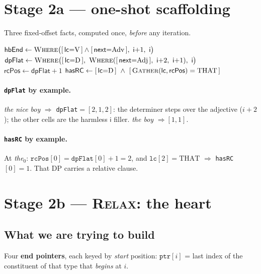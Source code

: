\documentclass[11pt]{article}
\newcommand{\code}[1]{\texttt{#1}}
\newcommand{\sop}[1]{\ensuremath{\mathsf{#1}}}
\begin{document}
\section{Stage 2a --- one-shot scaffolding}

Three fixed-offset facts, computed once, \emph{before} any iteration.

\begin{algorithm}[H]
\caption{\textsc{Scaffold} --- local span pieces}
\begin{algorithmic}[1]
\State $\sop{hbEnd} \gets \textsc{Where}\big([\,\sop{lc}{=}\text{V}\,]\wedge[\,\sop{next}{=}\text{Adv}\,],\ \sop{i}{+}1,\ \sop{i}\big)$ 
\State $\sop{dpFlat} \gets \textsc{Where}\big([\,\sop{lc}{=}\text{D}\,],\ \textsc{Where}([\,\sop{next}{=}\text{Adj}\,],\ \sop{i}{+}2,\ \sop{i}{+}1),\ \sop{i}\big)$ 
\State $\sop{rcPos} \gets \sop{dpFlat}+1$ 
\State $\sop{hasRC} \gets [\,\sop{lc}{=}\text{D}\,]\ \wedge\ [\,\textsc{Gather}(\sop{lc},\sop{rcPos})=\text{THAT}\,]$ 
\end{algorithmic}
\end{algorithm}

\paragraph{\code{dpFlat} by example.} \emph{the nice boy} $\Rightarrow$ \code{dpFlat}$=[2,1,2]$: the determiner
steps over the adjective ($i{+}2$); the other cells are the harmless $\sop{i}$ filler.
\emph{the boy} $\Rightarrow [1,1]$.

\paragraph{\code{hasRC} by example.} At \emph{the}$_0$: $\code{rcPos}[0]=\code{dpFlat}[0]{+}1=2$, and
$\code{lc}[2]=\text{THAT}$ $\Rightarrow$ \code{hasRC}$[0]=1$. That DP carries a relative clause.

\section{Stage 2b --- \textsc{Relax}: the heart}

\subsection{What we are trying to build}
Four \textbf{end pointers}, each keyed by \emph{start} position: $\code{ptr}[i]$ = last index of the
constituent of that type that \emph{begins} at $i$.
\end{document}
